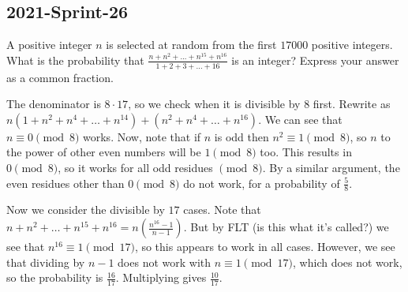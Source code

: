 \documentclass[12pt]{article}
\begin{document}
\subsection*{2021-Sprint-26}
A positive integer $n$ is selected at random from the first $17000$ positive integers. What is the probability that $\frac{n+n^2+...+n^{15}+n^{16}}{1+2+3+\dots+16}$ is an integer? Express your answer as a common fraction.
\begin{answer}
The denominator is $8 \cdot 17$, so we check when it is divisible by $8$ first. Rewrite as $n(1+n^2+n^4+\ldots+n^{14})+(n^2+n^4+\ldots+n^16)$. We can see that $n \equiv 0 \pmod 8$ works. Now, note that if $n$ is odd then $n^2 \equiv 1 \pmod 8$, so $n$ to the power of other even numbers will be $1 \pmod 8$ too. This results in $0 \pmod 8$, so it works for all odd residues $\pmod 8$. By a similar argument, the even residues other than $0 \pmod 8$ do not work, for a probability of $\frac{5}{8}$.

Now we consider the divisible by $17$ cases. Note that $n+n^2+\ldots+n^{15}+n^{16}=n\left(\frac{n^{16}-1}{n-1}\right)$. But by FLT (is this what it's called?) we see that $n^{16} \equiv 1 \pmod {17}$, so this appears to work in all cases. However, we see that dividing by $n-1$ does not work with $n \equiv 1 \pmod {17}$, which does not work, so the probability is $\frac{16}{17}$. Multiplying gives $\boxed{\frac{10}{17}}$.
\end{answer}

\end{document}
